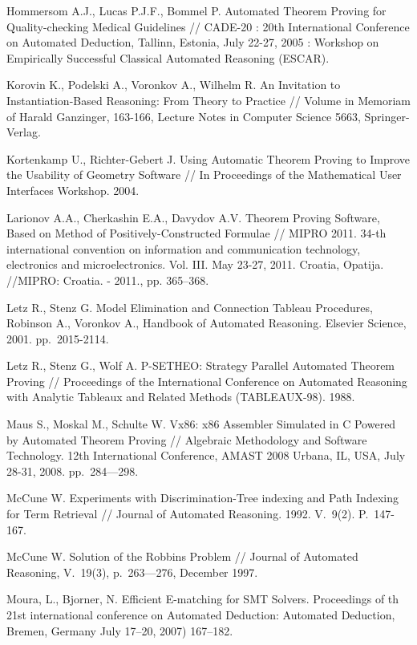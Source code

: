 \begin{thebibliography}{99}
 Hommersom A.J., Lucas P.J.F., Bommel P. Automated Theorem Proving for Quality-checking Medical Guidelines // CADE-20 : 20th International Conference on Automated Deduction, Tallinn, Estonia, July 22-27, 2005 : Workshop on Empirically Successful Classical Automated Reasoning (ESCAR).


 Korovin K., Podelski A., Voronkov A., Wilhelm R. An Invitation to Instantiation-Based Reasoning: From Theory to Practice // Volume in Memoriam of Harald Ganzinger, 163-166, Lecture Notes in Computer Science 5663, Springer-Verlag. 

 Kortenkamp U., Richter-Gebert J. Using Automatic Theorem Proving to Improve the Usability of Geometry Software // In Proceedings of the Mathematical User Interfaces Workshop. 2004.


  Larionov A.A., Cherkashin E.A., Davydov A.V. Theorem Proving Software, Based on Method of Positively-Constructed Formulae // MIPRO 2011. 34-th international convention on information and communication technology, electronics and microelectronics. Vol. III. May 23-27, 2011. Croatia, Opatija. //MIPRO: Croatia. - 2011., pp. 365--368.

 Letz R., Stenz G. Model Elimination and Connection Tableau Procedures, Robinson A., Voronkov A., Handbook of Automated Reasoning. Elsevier Science, 2001. pp.~2015-2114.  

  Letz R., Stenz G., Wolf A. P-SETHEO: Strategy Parallel Automated Theorem Proving // Proceedings of the International Conference on Automated Reasoning with Analytic Tableaux and Related Methods (TABLEAUX-98). 1988.

 Maus S., Moskal M., Schulte W. Vx86: x86 Assembler Simulated in C Powered by Automated Theorem Proving // Algebraic Methodology and Software Technology. 12th International Conference, AMAST 2008 Urbana, IL, USA, July 28-31, 2008. pp.~284---298.

 McCune W. Experiments with Discrimination-Tree indexing and Path Indexing for Term Retrieval // Journal of Automated Reasoning. 1992. V.~9(2). P.~147-167.

 McCune W. Solution of the Robbins Problem // Journal of Automated Reasoning, V.~19(3), p.~263---276, December 1997.

 Moura, L., Bjorner, N. Efficient E-matching for SMT Solvers. Proceedings of th 21st international conference on Automated Deduction: Automated Deduction, Bremen, Germany July 17--20, 2007) 167--182.


\end{thebibliography}
